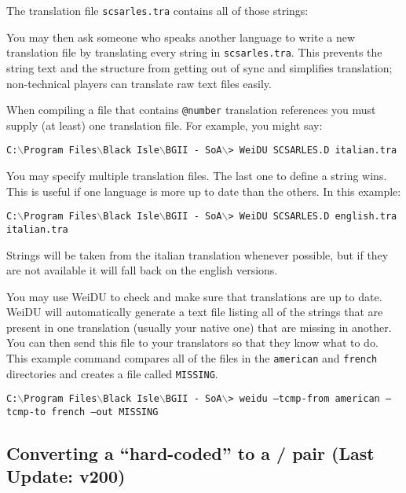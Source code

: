 \documentclass{article}
\def\ttref#1{\ahrefloc{#1}{\tt #1}}
\def\t#1{{\tt #1}}
\def\CMD#1{{\tt {C:$\backslash$Program Files$\backslash$Black Isle$\backslash$BGII - SoA$\backslash$>} \color{red} \t{#1} }}
\begin{document}
The translation file \t{scsarles.tra} contains all of those strings:
You may then ask someone who speaks another language to write a new
translation file by translating every string in \t{scsarles.tra}. This
prevents the string text and the structure from getting out of sync
and simplifies translation; non-technical players can translate raw text
files easily.

When compiling a \ttref{D} file that contains \t{@number} translation
references you must supply (at least) one translation file. For example,
you might say:

\CMD{WeiDU SCSARLES.D italian.tra}

You may specify multiple translation files. The last one to define a string
wins. This is useful if one language is more up to date than the others. In
this example:

\CMD{WeiDU SCSARLES.D english.tra italian.tra}

Strings will be taken from the italian translation whenever possible, but
if they are not available it will fall back on the english versions.

You may use WeiDU to check and make sure that translations are up to date.
WeiDU will automatically generate a text file listing all of the strings
that are present in one translation (usually your native one) that are
missing in another. You can then send this file to your translators so that
they know what to do. This example command compares all of the \ttref{TRA}
files in the \t{american} and \t{french} directories and creates a file
called \t{MISSING}.

\CMD{weidu --tcmp-from american --tcmp-to french --out MISSING}

\subsection{Converting a ``hard-coded'' \ttref{D} to a \ttref{D}/\ttref{TRA} pair (Last Update: v200)}
\end{document}
